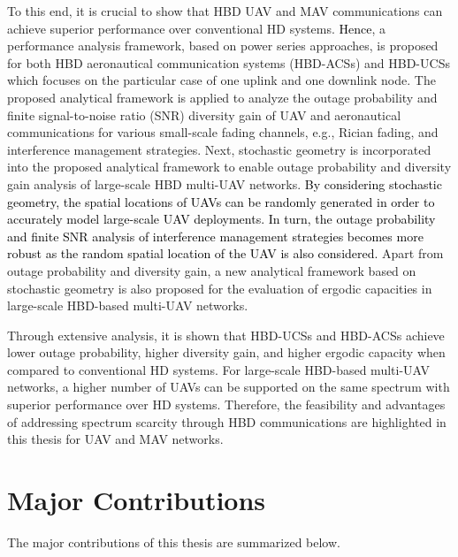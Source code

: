 To this end, it is crucial to show that HBD UAV and MAV communications can achieve superior performance over conventional HD systems. \textcolor{black}{Hence}, a performance analysis framework, based on power series approaches, is proposed for both HBD aeronautical communication systems (HBD-ACSs) and HBD-UCSs which focuses on the particular case of one uplink and one downlink node. The proposed analytical framework is applied to analyze the outage probability and finite signal-to-noise ratio (SNR) diversity gain of UAV and aeronautical communications for various small-scale fading channels, e.g., Rician fading, and interference management strategies. Next, stochastic geometry is incorporated into the proposed analytical framework to enable outage probability and diversity gain analysis of large-scale HBD multi-UAV networks. \textcolor{black}{By considering stochastic geometry, the spatial locations of UAVs can be randomly generated in order to accurately model large-scale UAV deployments. In turn, the outage probability and finite SNR analysis of interference management strategies becomes more robust as the random spatial location of the UAV is also considered.} Apart from outage probability and diversity gain, a new analytical framework based on stochastic geometry is also proposed for the evaluation of ergodic capacities in large-scale HBD-based multi-UAV networks. 

Through extensive analysis, it is shown that HBD-UCSs and HBD-ACSs achieve lower outage probability, higher diversity gain, and higher ergodic capacity when compared to conventional HD systems. For large-scale HBD-based multi-UAV networks, a higher number of UAVs can be supported on the same spectrum with superior performance over HD systems. Therefore, the feasibility and advantages of addressing spectrum scarcity through HBD communications are highlighted in this thesis for UAV and MAV networks.

\section{Major Contributions}
The major contributions of this thesis are summarized below.

